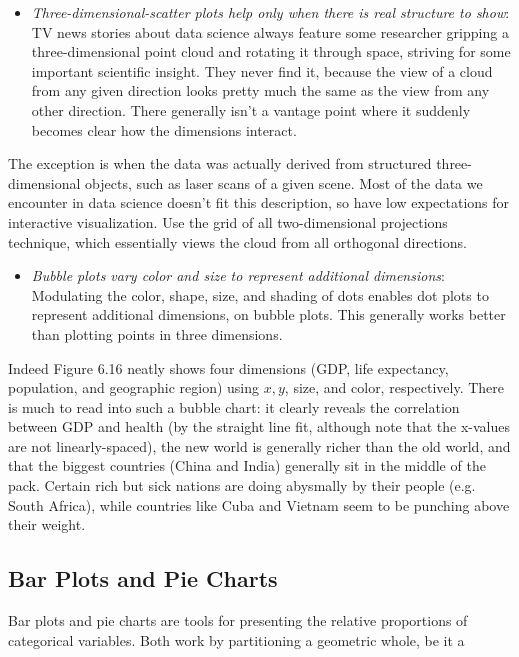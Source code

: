 \documentclass[10pt]{article}
\begin{document}
\begin{itemize}
  \item \textit{Three-dimensional-scatter plots help only when there is real structure to show}: TV news stories about data science always feature some researcher gripping a three-dimensional point cloud and rotating it through space, striving for some important scientific insight. They never find it, because the view of a cloud from any given direction looks pretty much the same as the view from any other direction. There generally isn't a vantage point where it suddenly becomes clear how the dimensions interact.
\end{itemize}

The exception is when the data was actually derived from structured three-dimensional objects, such as laser scans of a given scene. Most of the data we encounter in data science doesn't fit this description, so have low expectations for interactive visualization. Use the grid of all two-dimensional projections technique, which essentially views the cloud from all orthogonal directions.

\begin{itemize}
  \item \textit{Bubble plots vary color and size to represent additional dimensions}: Modulating the color, shape, size, and shading of dots enables dot plots to represent additional dimensions, on bubble plots. This generally works better than plotting points in three dimensions.
\end{itemize}

Indeed Figure 6.16 neatly shows four dimensions (GDP, life expectancy, population, and geographic region) using \( x, y \), size, and color, respectively. There is much to read into such a bubble chart: it clearly reveals the correlation between GDP and health (by the straight line fit, although note that the x-values are not linearly-spaced), the new world is generally richer than the old world, and that the biggest countries (China and India) generally sit in the middle of the pack. Certain rich but sick nations are doing abysmally by their people (e.g. South Africa), while countries like Cuba and Vietnam seem to be punching above their weight.

\subsection*{Bar Plots and Pie Charts}
Bar plots and pie charts are tools for presenting the relative proportions of categorical variables. Both work by partitioning a geometric whole, be it a
\end{document}
